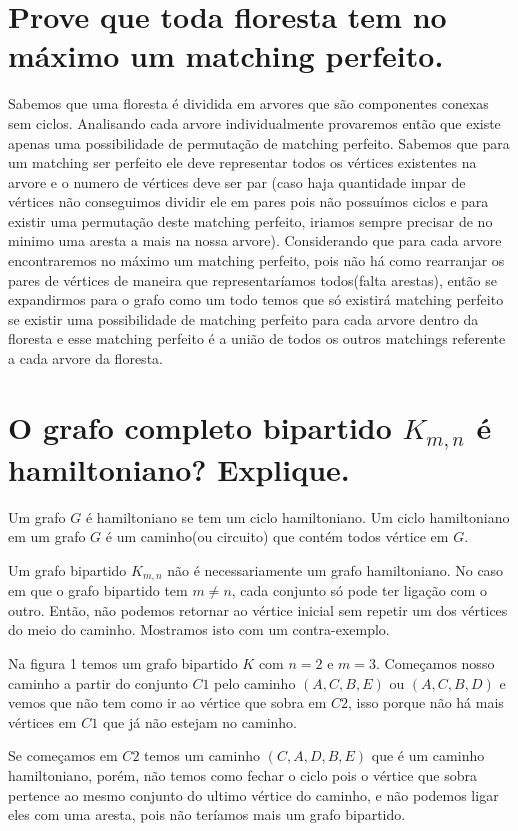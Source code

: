 \documentclass[a4paper,12pt]{article}
\begin{document}
\section{Prove que toda floresta tem no máximo um matching perfeito.}
	
	Sabemos que uma floresta é dividida em arvores que são componentes conexas sem ciclos. Analisando cada arvore individualmente provaremos então que existe apenas uma possibilidade de permutação de matching perfeito. Sabemos que para um matching ser perfeito ele deve representar todos os vértices existentes na arvore e o numero de vértices deve ser par (caso haja quantidade impar de vértices não conseguimos dividir ele em pares pois não possuímos ciclos e para existir uma permutação deste matching perfeito, iriamos sempre precisar de no minimo uma aresta a mais na nossa arvore). Considerando que para cada arvore encontraremos no máximo um matching perfeito, pois não há como rearranjar os pares de vértices de maneira que representaríamos todos(falta arestas), então se expandirmos para o grafo como um todo temos que só existirá matching perfeito se existir uma possibilidade de matching perfeito para cada arvore dentro da floresta e esse matching perfeito é a união de todos os outros matchings referente a cada arvore da floresta.

\section{O grafo completo bipartido $K_{m,n}$ é hamiltoniano? Explique.}

	Um grafo $G$ é hamiltoniano se tem um ciclo hamiltoniano. Um ciclo hamiltoniano em um grafo $G$ é um caminho(ou circuito) que contém todos vértice em $G$.

	Um grafo bipartido $K_{m,n}$ não é necessariamente um grafo hamiltoniano. No caso em que o grafo bipartido tem $m \neq n$, cada conjunto só pode ter ligação com o outro. Então, não podemos retornar ao vértice inicial sem repetir um dos vértices do meio do caminho. Mostramos isto com um contra-exemplo.

	Na figura 1 temos um grafo bipartido $K$ com $n = 2$ e $m = 3$. Começamos nosso caminho a partir do conjunto $C1$ pelo caminho $(A,C,B,E)$ ou $(A,C,B,D)$ e vemos que não tem como ir ao vértice que sobra em $C2$, isso porque não há mais vértices em $C1$ que já não estejam no caminho.

	Se começamos em $C2$ temos um caminho $(C,A,D,B,E)$ que é um caminho hamiltoniano, porém, não temos como fechar o ciclo pois o vértice que sobra pertence ao mesmo conjunto do ultimo vértice do caminho, e não podemos ligar eles com uma aresta, pois não teríamos mais um grafo bipartido.
\end{document}

